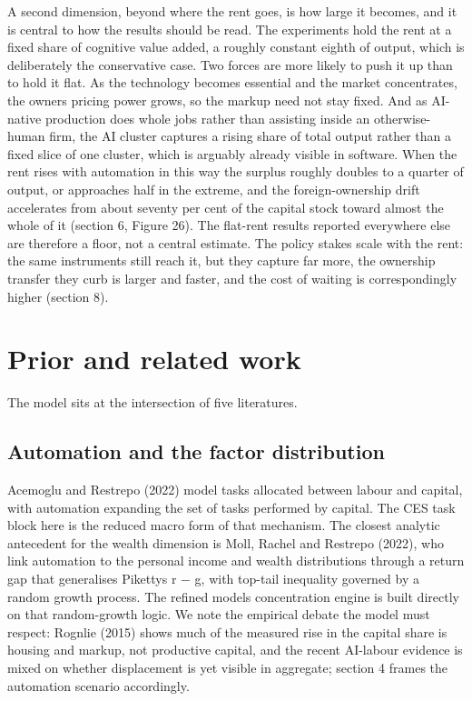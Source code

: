 \documentclass[12pt]{article}
\begin{document}
A second dimension, beyond where the rent goes, is how large it becomes,
and it is central to how the results should be read. The experiments
hold the rent at a fixed share of cognitive value added, a roughly
constant eighth of output, which is deliberately the conservative case.
Two forces are more likely to push it up than to hold it flat. As the
technology becomes essential and the market concentrates, the
owner\textquotesingle s pricing power grows, so the markup need not stay
fixed. And as AI-native production does whole jobs rather than assisting
inside an otherwise-human firm, the AI cluster captures a rising share
of total output rather than a fixed slice of one cluster, which is
arguably already visible in software. When the rent rises with
automation in this way the surplus roughly doubles to a quarter of
output, or approaches half in the extreme, and the foreign-ownership
drift accelerates from about seventy per cent of the capital stock
toward almost the whole of it (section 6, Figure 26). The flat-rent
results reported everywhere else are therefore a floor, not a central
estimate. The policy stakes scale with the rent: the same instruments
still reach it, but they capture far more, the ownership transfer they
curb is larger and faster, and the cost of waiting is correspondingly
higher (section 8).

\hypertarget{prior}{}
\hypertarget{prior-and-related-work}{%
\section{Prior and related work}\label{prior-and-related-work}}

The model sits at the intersection of five literatures.

\hypertarget{automation-and-the-factor-distribution}{%
\subsection{Automation and the factor
distribution}\label{automation-and-the-factor-distribution}}

Acemoglu and Restrepo (2022) model tasks allocated between labour and
capital, with automation expanding the set of tasks performed by
capital. The CES task block here is the reduced macro form of that
mechanism. The closest analytic antecedent for the wealth dimension is
Moll, Rachel and Restrepo (2022), who link automation to the personal
income and wealth distributions through a return gap that generalises
Piketty\textquotesingle s r $-$ g, with top-tail inequality governed by a
random growth process. The refined model\textquotesingle s concentration
engine is built directly on that random-growth logic. We note the
empirical debate the model must respect: Rognlie (2015) shows much of
the measured rise in the capital share is housing and markup, not
productive capital, and the recent AI-labour evidence is mixed on
whether displacement is yet visible in aggregate; section 4 frames the
automation scenario accordingly.
\end{document}

